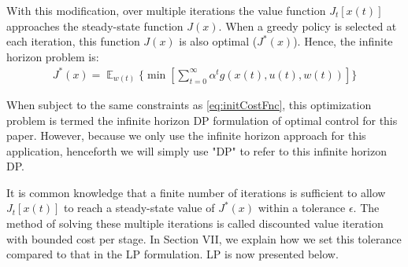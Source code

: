 \documentclass[conference]{IEEEtran}
\DeclareMathOperator{\E}{\mathbb{E}}
\begin{document}
With this modification, over multiple iterations the value function $J_{t}[x(t)]$ approaches the steady-state function $J(x)$. When a greedy policy is selected at each iteration, this function $J(x)$ is also optimal ($J^{*}(x)$). Hence, the infinite horizon problem is:
\begin{multline} \label{eq:DP}
J^{*}(x)=\mathop{\E}_{w(t)} \Biggl\{\min\left[\sum_{t=0}^{\infty}\alpha^{t}g(x(t),u(t),w(t))\right]\Biggr\}
\end{multline}

When subject to the same constraints as \eqref{eq:initCostFnc}, this optimization problem is termed the infinite horizon DP formulation of optimal control for this paper. However, because we only use the infinite horizon approach for this application, henceforth we will simply use "DP" to refer to this infinite horizon DP.

It is common knowledge that a finite number of iterations is sufficient to allow $J_{t}[x(t)]$ to reach a steady-state value of $J^{*}(x)$ within a tolerance $\epsilon$. The method of solving these multiple iterations is called discounted value iteration with bounded cost per stage. In Section VII, we explain how we set this tolerance compared to that in the LP formulation. LP is now presented below.


\end{document}
